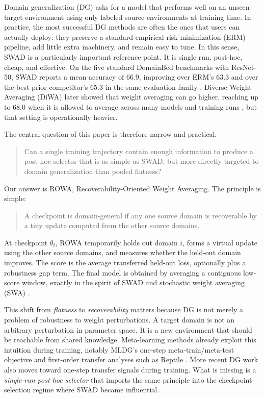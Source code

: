 \documentclass{article}
\newcommand{\rowa}{\textup{\textsc{ROWA}}}
\newcommand{\swad}{\textup{\textsc{SWAD}}}
\begin{document}
Domain generalization (DG) asks for a model that performs well on an unseen target environment using only labeled source environments at training time. In practice, the most successful DG methods are often the ones that users can actually deploy: they preserve a standard empirical risk minimization (ERM) pipeline, add little extra machinery, and remain easy to tune. In this sense, \swad{} \citep{cha2021wad} is a particularly important reference point. It is single-run, post-hoc, cheap, and effective. On the five standard DomainBed benchmarks with ResNet-50, \swad{} reports a mean accuracy of $66.9$, improving over ERM's $63.3$ and over the best prior competitor's $65.3$ in the same evaluation family \citep{cha2021wad}. Diverse Weight Averaging (DiWA) later showed that weight averaging can go higher, reaching up to $68.0$ when it is allowed to average across many models and training runs \citep{rame2022diwa}, but that setting is operationally heavier.

The central question of this paper is therefore narrow and practical:
\begin{quote}
Can a single training trajectory contain enough information to produce a post-hoc selector that is as simple as \swad{}, but more directly targeted to domain generalization than pooled flatness?
\end{quote}

Our answer is \rowa{}, Recoverability-Oriented Weight Averaging. The principle is simple:
\begin{quote}
    A checkpoint is domain-general if any one source domain is recoverable by a tiny update computed from the other source domains.
\end{quote}
At checkpoint $\theta_t$, \rowa{} temporarily holds out domain $i$, forms a virtual update using the other source domains, and measures whether the held-out domain improves. The score is the average transferred held-out loss, optionally plus a robustness gap term. The final model is obtained by averaging a contiguous low-score window, exactly in the spirit of \swad{} and stochastic weight averaging (SWA) \citep{izmailov2018swa}.

This shift from \emph{flatness} to \emph{recoverability} matters because DG is not merely a problem of robustness to weight perturbations. A target domain is not an arbitrary perturbation in parameter space. It is a new environment that should be reachable from shared knowledge. Meta-learning methods already exploit this intuition during training, notably MLDG's one-step meta-train/meta-test objective \citep{li2018mldg} and first-order transfer analyses such as Reptile \citep{nichol2018reptile}. More recent DG work also moves toward one-step transfer signals during training. What is missing is a \emph{single-run post-hoc selector} that imports the same principle into the checkpoint-selection regime where \swad{} became influential.
\end{document}
